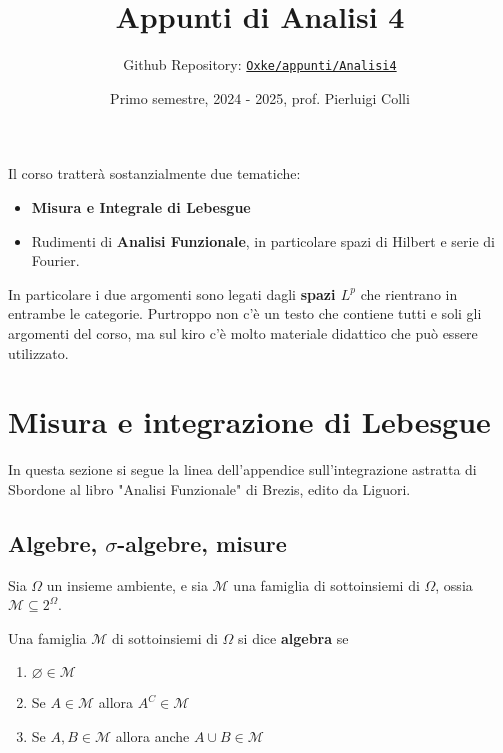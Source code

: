
\title{Appunti di Analisi 4}
\author{Github Repository:
\href{https://github.com/Oxke/appunti/tree/main/Analisi4}{\texttt{Oxke/appunti/Analisi4}}}
\date{Primo semestre, 2024 \-- 2025, prof. Pierluigi Colli}

\maketitle

Il corso tratterà sostanzialmente due tematiche:
\begin{itemize}[label = --]
    \item \textbf{Misura e Integrale di Lebesgue}
    \item Rudimenti di \textbf{Analisi Funzionale}, in particolare spazi di Hilbert e serie di Fourier.
\end{itemize}
In particolare i due argomenti sono legati dagli \textbf{spazi \(L^{p}\)} che rientrano in entrambe
le categorie.
Purtroppo non c'è un testo che contiene tutti e soli gli argomenti del corso, ma
sul kiro c'è molto materiale didattico che può essere utilizzato.
\tableofcontents
\newpage

\section{Misura e integrazione di Lebesgue}
In questa sezione si segue la linea dell'appendice sull'integrazione astratta di
Sbordone al libro "Analisi Funzionale" di Brezis, edito da Liguori.

\subsection{Algebre, \(\sigma\)-algebre, misure}
Sia \(\Omega\) un insieme ambiente, e sia \(\mathcal{M}\) una famiglia di
sottoinsiemi di \(\Omega\), ossia \(\mathcal{M} \subseteq 2^{\Omega} \).
\begin{definition}[Algebra]
    Una famiglia \(\mathcal{M}\) di sottoinsiemi di \(\Omega\) si dice
    \textbf{algebra} se
\begin{enumerate}[label = \arabic*.]
    \item \(\varnothing \in \mathcal{M} \) 
    \item Se \(A \in \mathcal{M}\) allora \(A^{C} \in \mathcal{M}\) 
    \item Se \(A, B \in \mathcal{M}\) allora anche \(A \cup B \in \mathcal{M}\) 
\end{enumerate}
\end{definition}

